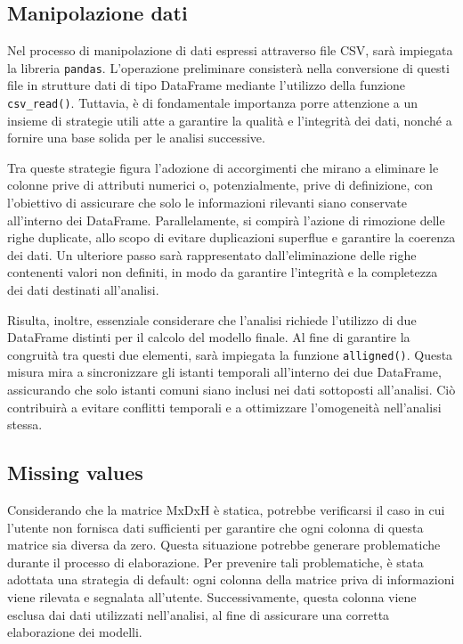 \documentclass[a4paper,10pt]{article}
\begin{document}
\subsection{Manipolazione dati}
Nel processo di manipolazione di dati espressi attraverso file CSV, sarà impiegata la libreria  \texttt{pandas}. L'operazione preliminare 
consisterà nella conversione di questi file in strutture dati di tipo DataFrame mediante l'utilizzo della funzione  \texttt{csv\_read()}. 
Tuttavia, è di fondamentale importanza porre attenzione a un insieme di strategie utili atte a garantire la qualità e l'integrità dei dati, 
nonché a fornire una base solida per le analisi successive.

Tra queste strategie figura l'adozione di accorgimenti che mirano a eliminare le colonne prive di attributi numerici o, potenzialmente, 
prive di definizione, con l'obiettivo di assicurare che solo le informazioni rilevanti siano conservate all'interno dei DataFrame. 
Parallelamente, si compirà l'azione di rimozione delle righe duplicate, allo scopo di evitare duplicazioni superflue e garantire la coerenza dei dati. 
Un ulteriore passo sarà rappresentato dall'eliminazione delle righe contenenti valori non definiti, in modo da garantire l'integrità e la completezza 
dei dati destinati all'analisi.

Risulta, inoltre, essenziale considerare che l'analisi richiede l'utilizzo di due DataFrame distinti per il calcolo del modello finale. 
Al fine di garantire la congruità tra questi due elementi, sarà impiegata la funzione \texttt{alligned()}. Questa misura mira a sincronizzare 
gli istanti temporali all'interno dei due DataFrame, assicurando che solo istanti comuni siano inclusi nei dati sottoposti all'analisi. 
Ciò contribuirà a evitare conflitti temporali e a ottimizzare l'omogeneità nell'analisi stessa.

\subsection{Missing values}

Considerando che la matrice MxDxH è statica, potrebbe verificarsi il caso in cui l'utente non fornisca dati sufficienti per garantire che ogni 
colonna di questa matrice sia diversa da zero. Questa situazione potrebbe generare problematiche durante il processo di elaborazione. 
Per prevenire tali problematiche, è stata adottata una strategia di default: ogni colonna della matrice priva di informazioni viene rilevata e segnalata 
all'utente. Successivamente, questa colonna viene esclusa dai dati utilizzati nell'analisi, al fine di assicurare una corretta elaborazione dei modelli.
\end{document}
